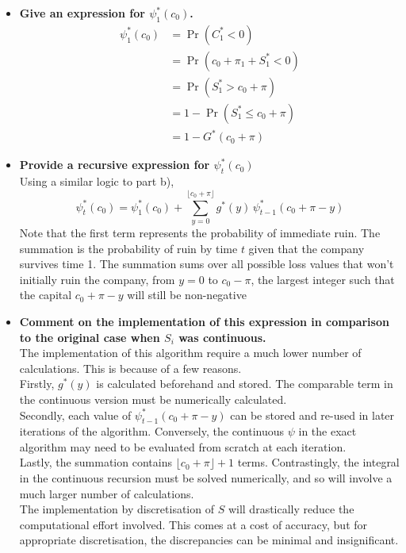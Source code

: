 \documentclass[titlepage]{article}
\begin{document}
	\begin{itemize}
		\item \textbf{Give an expression for $\psi_1^*(c_0)$.}\\
		\begin{align*}
			\psi_1^*(c_0)&= \Pr(C^*_1<0)\\
			&= \Pr(c_0 + \pi_1 + S^*_1<0)\\
			&= \Pr(S^*_1 > c_0 + \pi)\\
			&= 1-\Pr(S^*_1 \leq c_0 + \pi)\\
			&= 1 - G^*(c_0 + \pi)
		\end{align*}
		\item \textbf{Provide a recursive expression for $\psi^*_t(c_0)$}\\
		Using a similar logic to part b),
		$$\psi^*_t(c_0) = \psi^*_1(c_0) + \sum_{y = 0}^{\lfloor c_0 + \pi \rfloor}g^*(y)\,\psi_{t-1}^*(c_0 + \pi - y)$$
		Note that the first term represents the probability of immediate ruin. The summation is the probability of ruin by time $t$ given that the company survives time 1. The summation sums over all possible loss values that won't initially ruin the company, from $y=0$ to $c_0-\pi$, the largest integer such that the capital $c_0+\pi-y$ will still be non-negative
		\item \textbf{Comment on the implementation of this expression in comparison to the original case when $S_i$ was continuous.}\\
		The implementation of this algorithm require a much lower number of calculations. This is because of a few reasons. \\
		Firstly, $g^*(y)$ is calculated beforehand and stored. The comparable term in the continuous version must be numerically calculated.\\
		Secondly, each value of $ \psi_{t-1}^*(c_0 + \pi - y) $ can be stored and re-used in later iterations of the algorithm. Conversely, the continuous $\psi$ in the exact algorithm may need to be evaluated from scratch at each iteration.\\
		Lastly, the summation contains $\lfloor c_0 + \pi \rfloor + 1$ terms. Contrastingly, the integral in the continuous recursion must be solved numerically, and so will involve a much larger number of calculations.\\
		The implementation by discretisation of $S$ will drastically reduce the computational effort involved. This comes at a cost of accuracy, but for appropriate discretisation, the discrepancies can be minimal and insignificant.
		
	\end{itemize}
\end{document}
